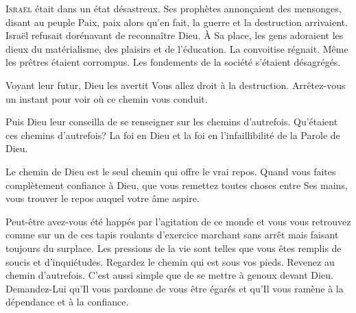 




\lettrine{I}{sraël} était dans un état désastreux.
 Ses prophètes annon\c{c}aient des mensonges, disant au peuple\frcolon{} 
 \Og Paix, paix \Fg{} alors qu'en fait, la guerre et la destruction arrivaient.
 Israël refusait dorénavant de reconnaître Dieu.
 À Sa place, les gens adoraient les dieux du matérialisme, des plaisirs
 et de l'éducation. La convoitise régnait.
 Même les prêtres étaient corrompus.
 Les fondements de la société s'étaient désagrégés. 

Voyant leur futur, Dieu les avertit\frcolon{}
 \Og Vous allez droit à la destruction.
 Arrêtez-vous un instant pour voir où ce chemin vous conduit. \Fg{}

Puis Dieu leur conseilla de
 \Og se renseigner sur les chemins d'autrefois. \Fg{}
 Qu'étaient ces chemins d'autrefois? La foi en Dieu et la foi
 en l'infaillibilité de la Parole de Dieu. 


Le chemin de Dieu est le seul chemin qui offre le vrai repos.
 Quand vous faites complètement confiance à Dieu,
 que vous remettez toutes choses entre Ses mains,
 vous trouver le repos auquel votre âme aspire. 

Peut-être avez-vous été happés par l'agitation de ce monde
 et vous vous retrouvez comme sur un de ces tapis roulants d'exercice
 \ocadr marchant sans arrêt mais faisant toujours du surplace.
 Les pressions de la vie sont telles que vous êtes remplis de soucis
 et d'inquiétudes. Regardez le chemin qui est sous vos pieds.
 Revenez au chemin d'autrefois. C'est aussi simple que de se mettre
 à genoux devant Dieu. Demandez-Lui qu'Il vous pardonne de vous
 être égarés et qu'Il vous ramène à la dépendance et à la confiance. 

